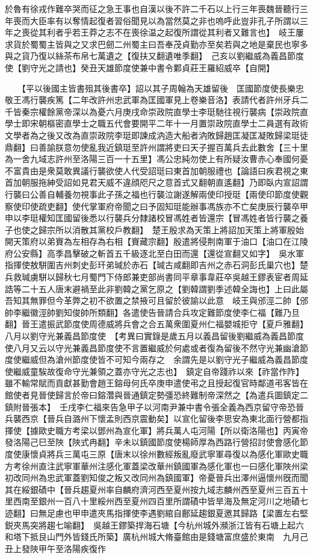 於魯有徐戎作難卒哭而征之急王事也自漢以後不許二千石以上行三年喪魏晉聽行三年喪而大臣率有以奪情起復者習俗聞見以為當然莫之非也嗚呼此豈非孔子所謂以三年之喪從其利者乎若王莽之志不在喪徐温之起復所謂從其利者又難言也】　岐王屢求貨於蜀蜀主皆與之又求巴劒二州蜀主曰吾奉茂貞勤亦至矣若與之地是棄民也寧多與之貨乃復以絲茶布帛七萬遺之【復扶又翻遺唯季翻】　己亥以劉繼威為義昌節度使【劉守光之請也】癸丑天雄節度使兼中書令鄴貞莊王羅紹威卒【自開】

　　【平以後國主皆書殂其後書卒】詔以其子周翰為天雄留後　匡國節度使長樂忠敬王馮行襲疾篤【二年改許州忠武軍為匡國軍見上卷樂音洛】表請代者許州牙兵二千皆秦宗權餘黨帝深以為憂六月庚戌命崇政院直學士李珽馳往視行襲病【崇政院直學士即宋朝樞密直學士之職五代會要開平二年十一月置崇政院直學士二員選有政術文學者為之後又改為直崇政院李珽即諫成汭造大船者汭敗歸趙匡凝匡凝敗歸梁珽徒鼎翻】曰善諭朕意勿使亂我近鎮珽至許州謂將吏曰天子握百萬兵去此數舍【三十里為一舍九域志許州至洛陽三百一十五里】馮公忠純勿使上有所疑汝曹赤心奉國何憂不富貴由是衆莫敢異議行襲欲使人代受詔珽曰東首加朝服禮也【論語曰疾君視之東首加朝服拖紳受詔如見君天威不違顔咫尺之意首式又翻朝直遙翻】乃即臥内宣詔謂行襲曰公善自輔養勿視事此子孫之福也行襲泣謝遂解兩使印授珽【兩使印節度使觀察使印使疏吏翻】使代掌軍府帝聞之曰予固知珽能辦事馮族亦不亡矣庚辰行襲卒甲申以李珽權知匡國留後悉以行襲兵分隸諸校冒馮姓者皆還宗【冒馮姓者皆行襲之養子也使之歸宗所以消散其黨校戶教翻】　楚王殷求為天策上將詔加天策上將軍殷始開天策府以弟賨為左相存為右相【賨藏宗翻】殷遣將侵荆南軍于油口【油口在江陵府公安縣】高季昌擊破之斬首五千級逐北至白田而還【還從宣翻又如字】　吳水軍指揮使敖駢圍吉州刺史彭玕弟瑊於赤石【瑊古咸翻即吉州之赤石洞彭氏巢穴也】楚兵救瑊虜駢以歸秋七月蜀門下侍郎兼吏部尚書同平章事韋莊卒吳越王鏐表宦者周延誥等二十五人唐末避禍至此非劉韓之黨乞原之【劉韓謂劉季述韓全誨也】上曰此屬吾知其無罪但今革弊之初不欲置之禁掖可且留於彼諭以此意　岐王與邠涇二帥【邠帥李繼徽涇帥劉知俊帥所類翻】各遣使告晉請合兵攻定難節度使李仁福【難乃旦翻】晉王遣振武節度使周德威將兵會之合五萬衆圍夏州仁福嬰城拒守【夏戶雅翻】　八月以劉守光兼義昌節度使　【考異曰實錄是歲五月以義昌留後劉繼威為義昌節度使八月又云以守光兼義昌節度使不言置繼威於何處或者復為留後不然守光兼幽滄節度使繼威但為滄州節度使皆不可知今兩存之　余謂先是以劉守光子繼威為義昌節度使繼威童騃故復命守光兼領之蓋亦守光之志也】　鎮定自帝踐祚以來【祚當作阼】雖不輸常賦而貢獻甚勤會趙王鎔母何氏卒庚申遣使弔之且授起復官時鄰道弔客皆在館使者見晉使歸言於帝曰鎔濳與晉通鎮定勢彊恐終難制帝深然之【為遣兵圖鎮定二鎮附晉張本】　壬戌李仁福來告急甲子以河南尹兼中書令張全義為西京留守帝恐晉兵襲西京【晉兵自潞州下懷孟則西京震動矣】以宣化留後李思安為東北面行營都指揮使【據歐史職方考梁以鄧州為宣化軍】將兵萬人屯河陽【所以衛洛陽也】丙寅帝發洛陽己巳至陜【陜式冉翻】辛未以鎮國節度使楊師厚為西路行營招討使會感化節度使康懷貞將兵三萬屯三原【唐末以徐州數經叛亂廢武寧軍尋復以為感化軍歐史職方考徐州直注武寧軍華州注感化軍蓋梁改華州鎮國軍為感化軍也一曰感化軍陜州梁初改同州為忠武軍蓋劉知俊之叛又改同州為鎮國軍】帝憂晉兵出澤州逼懷州旣而聞其在綏銀磧中【晉兵趨夏州率自麟府濟河西至夏州按九域志麟州西至夏州三百五十里西南至銀州一百八十里綏州西至夏州四百里所謂磧中皆旱海及無定河川之地磧七迹翻】曰無足慮也甲申遣夾馬指揮使李遇劉綰自鄜延趨銀夏邀其歸路【梁置左右堅鋭夾馬突將趨七喻翻】　吳越王鏐築捍海石塘【今杭州城外瀕浙江皆有石塘上起六和塔下抵艮山門外皆錢氏所築】廣杭州城大脩臺館由是錢塘富庶盛於東南　九月己丑上發陜甲午至洛陽疾復作